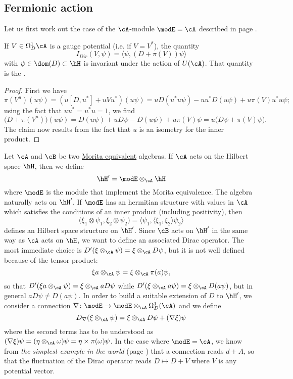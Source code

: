\subsection{Fermionic action}

Let us first work out the case of the $\cA$-module $\modE=\cA$ described in page \pageref{PgSimplestwordl}.

\begin{theorem}
If $V\in\Omega^1_D\cA$ is a gauge potential (i.e. if $V=V^*$), the quantity
\begin{equation}
I_{Dir}(V,\psi)=\langle \psi, (D+\pi(V))\psi\rangle 
\end{equation}
with $\psi\in\dom(D)\subset\hH$ is invariant under the action of $U(\cA)$. That quantity is the .
\end{theorem}

\begin{proof}
First we have 
\[ 
  \pi(V^u)(u\psi)=(u[D,u^*]+uVu^*)(u\psi)=uD(u^*u\psi)-uu^*D(u\psi)+u\pi(V)u^*u\psi;
\]
using the fact that $uu^*=u^*u=1$, we find
\[ 
  \big( D+\pi(V^u) \big)(u\psi)=D(u\psi)+uD\psi-D(u\psi)+u\pi(V)\psi=u\big( D\psi+\pi(V)\psi \big).
\]
The claim now results from the fact that $u$ is an isometry for the inner product.
\end{proof}

Let $\cA$ and $\cB$ be two \hyperref[PgMoritaEq]{Morita equivalent} algebras. If $\cA$ acts on the Hilbert space $\hH$, then we define
\[ 
  \hH'=\modE\otimes_{\cA}\hH
\]
where $\modE$ is the module that implement the Morita equivalence. The algebra naturally acts on $\hH'$. If $\modE$ has an hermitian structure with values in $\cA$ which satisfies the conditions of an inner product (including positivity), then
\begin{equation}
\big( \xi_1\otimes\psi_1,\xi_2\otimes\psi_2 \big)=\langle \psi_1, \langle \xi_1, \xi_2\rangle \psi_2\rangle 
\end{equation}
defines an Hilbert space structure on $\hH'$. Since $\cB$ acts on $\hH'$ in the same way as $\cA$ acts on $\hH$, we want to define an associated Dirac operator. The most immediate choice is $D'(\xi\otimes_{\cA}\psi)=\xi\otimes_{\cA}D\psi$, but it is not well defined because of the tensor product:
\[ 
  \xi a\otimes_{\cA}\psi=\xi\otimes_{\cA}\pi(a)\psi,
\]
so that $D'(\xi a\otimes_{\cA}\psi)=\xi\otimes_{\cA}aD\psi$ while $D'(\xi\otimes_{\cA}a\psi)=\xi\otimes_{\cA}D(a\psi)$, but in general $aD\psi\neq D(a\psi)$. In order to build a suitable extension of $D$ to $\hH'$, we consider a connection $\nabla\colon \modE\to \modE\otimes_{\cA}\Omega^1_D(\cA)$ and we define
\[ 
  D_{\nabla}(\xi\otimes_{\cA}\psi)=\xi\otimes_{\cA}D\psi+(\nabla\xi)\psi
\]
where the second terms has to be understood as $(\nabla\xi)\psi=(\eta\otimes_{\cA}\omega)\psi=\eta\times\pi(\omega)\psi$. In the case where $\modE=\cA$, we know from \emph{the simplest example in the world} (page \pageref{ConnEequalAsime}) that a connection reads $d+A$, so that the fluctuation of the Dirac operator reads $D\mapsto D+V$ where $V$ is any potential vector.



